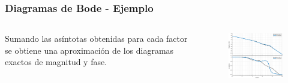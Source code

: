 \documentclass[aspectratio=169, handout]{beamer}
\theoremstyle{definition}
\theoremstyle{plain}
\theoremstyle{remark}
\begin{document}
\begin{frame}[<+->]\frametitle{Diagramas de Bode - Ejemplo}
	\vspace*{-2mm}
	\begin{columns}
		\begin{column}{0.3\textwidth}
			Sumando las asíntotas obtenidas para cada factor se obtiene una aproximación de los diagramas exactos de magnitud y fase.
		\end{column}
		\begin{column}{0.7\textwidth}
			\begin{figure}
				\centering
				\includegraphics[width=9cm]{images/bodeExample1b.eps}
			\end{figure}
		\end{column}
	\end{columns}
\end{frame}
\end{document}
